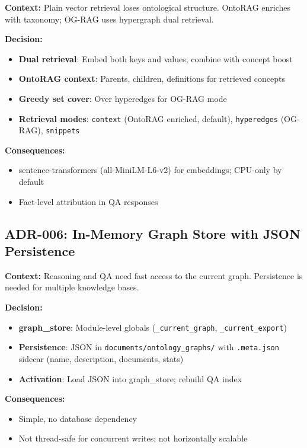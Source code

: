 \documentclass[11pt,a4paper]{article}
\begin{document}
\textbf{Context:} Plain vector retrieval loses ontological structure. OntoRAG enriches with taxonomy; OG-RAG uses hypergraph dual retrieval.

\textbf{Decision:}
\begin{itemize}
    \item \textbf{Dual retrieval}: Embed both keys and values; combine with concept boost
    \item \textbf{OntoRAG context}: Parents, children, definitions for retrieved concepts
    \item \textbf{Greedy set cover}: Over hyperedges for OG-RAG mode
    \item \textbf{Retrieval modes}: \texttt{context} (OntoRAG enriched, default), \texttt{hyperedges} (OG-RAG), \texttt{snippets}
\end{itemize}

\textbf{Consequences:}
\begin{itemize}
    \item sentence-transformers (all-MiniLM-L6-v2) for embeddings; CPU-only by default
    \item Fact-level attribution in QA responses
\end{itemize}

\subsection{ADR-006: In-Memory Graph Store with JSON Persistence}
\label{sec:adr-storage}

\textbf{Context:} Reasoning and QA need fast access to the current graph. Persistence is needed for multiple knowledge bases.

\textbf{Decision:}
\begin{itemize}
    \item \textbf{graph\_store}: Module-level globals (\texttt{\_current\_graph}, \texttt{\_current\_export})
    \item \textbf{Persistence}: JSON in \texttt{documents/ontology\_graphs/} with \texttt{.meta.json} sidecar (name, description, documents, stats)
    \item \textbf{Activation}: Load JSON into graph\_store; rebuild QA index
\end{itemize}

\textbf{Consequences:}
\begin{itemize}
    \item Simple, no database dependency
    \item Not thread-safe for concurrent writes; not horizontally scalable
\end{itemize}
\end{document}
